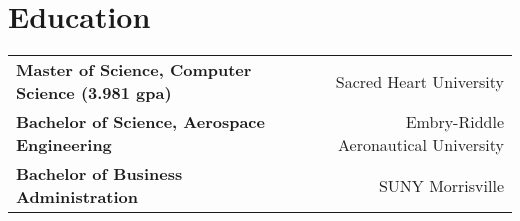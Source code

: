 

\section*{Education}
\noindent
\begin{tabularx}{\textwidth}{@{}Xr@{}}
    \textbf{Master of Science, Computer Science \small{(3.981 gpa)}} & Sacred Heart University \\
    \textbf{Bachelor of Science, Aerospace Engineering} & Embry-Riddle Aeronautical University \\
    \textbf{Bachelor of Business Administration} & SUNY Morrisville \\
\end{tabularx}